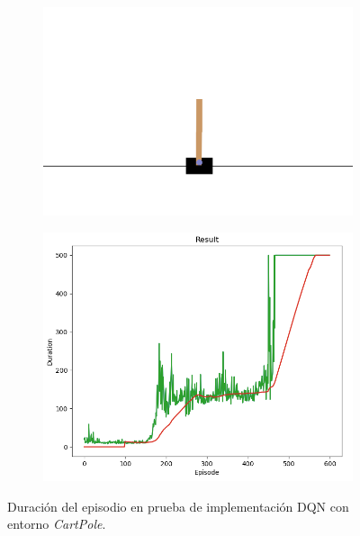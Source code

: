 \begin{figure}[hh]
    \centering
    \begin{subfigure}[b]{0.45\textwidth}
        \centering
        \includegraphics[width=\textwidth]{fig/new/CartPole1_1.png}
        \caption{ }
        \label{fig:figura1}
    \end{subfigure}
    \hfill
    \begin{subfigure}[b]{0.45\textwidth}
        \centering
        \includegraphics[width=\textwidth]{fig/new/CartPole1.png}
        \caption{ }
        \label{fig:figura2}
    \end{subfigure}
    \caption{Duración del episodio en prueba de implementación DQN con entorno \textit{CartPole}.}
    \label{fig:CartPole1}
\end{figure}


